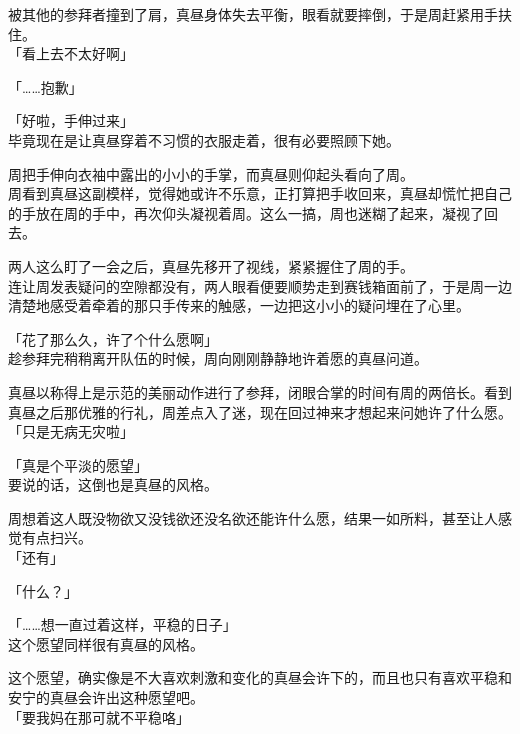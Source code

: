 被其他的参拜者撞到了肩，真昼身体失去平衡，眼看就要摔倒，于是周赶紧用手扶住。\\

「看上去不太好啊」

「……抱歉」

「好啦，手伸过来」\\

毕竟现在是让真昼穿着不习惯的衣服走着，很有必要照顾下她。

周把手伸向衣袖中露出的小小的手掌，而真昼则仰起头看向了周。\\

周看到真昼这副模样，觉得她或许不乐意，正打算把手收回来，真昼却慌忙把自己的手放在周的手中，再次仰头凝视着周。这么一搞，周也迷糊了起来，凝视了回去。

两人这么盯了一会之后，真昼先移开了视线，紧紧握住了周的手。\\

连让周发表疑问的空隙都没有，两人眼看便要顺势走到赛钱箱面前了，于是周一边清楚地感受着牵着的那只手传来的触感，一边把这小小的疑问埋在了心里。\\

\vspace{2\baselineskip}

「花了那么久，许了个什么愿啊」\\

趁参拜完稍稍离开队伍的时候，周向刚刚静静地许着愿的真昼问道。

真昼以称得上是示范的美丽动作进行了参拜，闭眼合掌的时间有周的两倍长。看到真昼之后那优雅的行礼，周差点入了迷，现在回过神来才想起来问她许了什么愿。\\

「只是无病无灾啦」

「真是个平淡的愿望」\\

要说的话，这倒也是真昼的风格。

周想着这人既没物欲又没钱欲还没名欲还能许什么愿，结果一如所料，甚至让人感觉有点扫兴。\\

「还有」

「什么？」

「……想一直过着这样，平稳的日子」\\

这个愿望同样很有真昼的风格。

这个愿望，确实像是不大喜欢刺激和变化的真昼会许下的，而且也只有喜欢平稳和安宁的真昼会许出这种愿望吧。\\

「要我妈在那可就不平稳咯」

